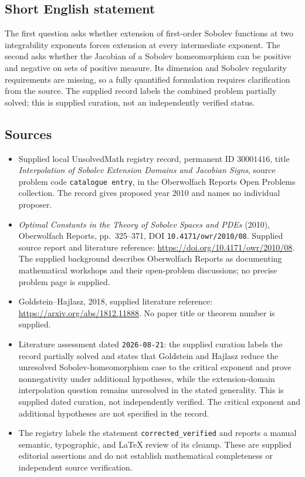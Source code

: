 \documentclass[11pt]{article}
\begin{document}
\subsection{Short English statement}
The first question asks whether extension of first-order Sobolev functions at two integrability exponents forces extension at every intermediate exponent. The second asks whether the Jacobian of a Sobolev homeomorphism can be positive and negative on sets of positive measure. Its dimension and Sobolev regularity requirements are missing, so a fully quantified formulation requires clarification from the source. The supplied record labels the combined problem partially solved; this is supplied curation, not an independently verified status.
\subsection{Sources}
\begin{itemize}
\item Supplied local UnsolvedMath registry record, permanent ID \(30001416\), title \emph{Interpolation of Sobolev Extension Domains and Jacobian Signs}, source problem code \texttt{catalogue entry}, in the Oberwolfach Reports Open Problems collection. The record gives proposed year 2010 and names no individual proposer.
\item \emph{Optimal Constants in the Theory of Sobolev Spaces and PDEs} (2010), Oberwolfach Reports, pp.~325--371, DOI \texttt{10.4171/owr/2010/08}. Supplied source report and literature reference: \url{https://doi.org/10.4171/owr/2010/08}. The supplied background describes Oberwolfach Reports as documenting mathematical workshops and their open-problem discussions; no precise problem page is supplied.
\item Goldstein--Hajlasz, 2018, supplied literature reference: \url{https://arxiv.org/abs/1812.11888}. No paper title or theorem number is supplied.
\item Literature assessment dated \texttt{2026-08-21}: the supplied curation labels the record partially solved and states that Goldstein and Hajlasz reduce the unresolved Sobolev-homeomorphism case to the critical exponent and prove nonnegativity under additional hypotheses, while the extension-domain interpolation question remains unresolved in the stated generality. This is supplied dated curation, not independently verified. The critical exponent and additional hypotheses are not specified in the record.
\item The registry labels the statement \texttt{corrected\_verified} and reports a manual semantic, typographic, and LaTeX review of its cleanup. These are supplied editorial assertions and do not establish mathematical completeness or independent source verification.
\end{itemize}
\end{document}
